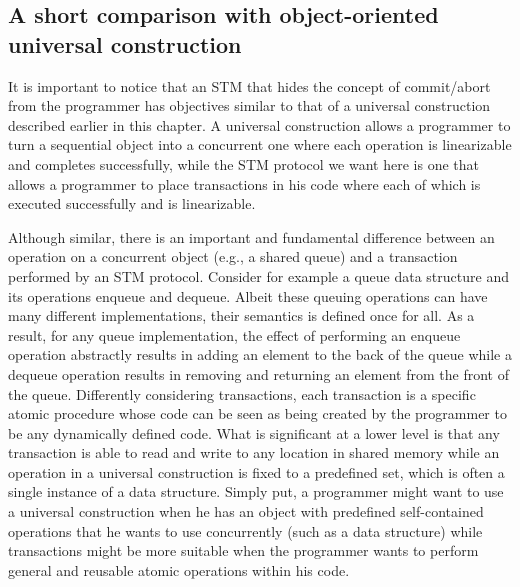 \subsection{A short comparison with object-oriented universal construction}
\label{sec:comparison-Herlihy}

It is important to notice that an STM that hides the concept of
commit/abort from the programmer has objectives similar to that of a
universal construction described earlier in this chapter.
A universal construction allows a programmer to turn a sequential
object into a concurrent one where each operation is linearizable
and completes successfully, while
the STM protocol we want here is one that allows a programmer to place transactions
in his code where each of which is executed successfully and is linearizable.


Although similar, there is an important and fundamental difference between an operation on 
a concurrent object (e.g.,  a shared queue) and a transaction performed
by an STM protocol. 
Consider for example a queue data structure and its operations enqueue
and dequeue.
Albeit these queuing operations can have many different implementations, 
their semantics is  defined once for all.
As a result, for any queue implementation, the effect of performing an enqueue operation
abstractly results in adding an element to the back of the queue
while a dequeue operation results in removing and returning an element from the
front of the queue.
Differently considering transactions, each transaction is a specific  atomic procedure whose 
code can be  seen as being created by the programmer to be any dynamically  defined code.
What is significant at a lower level is that any transaction is  able to read and
write to  any location in shared  memory while an operation  in a universal
construction is fixed to a predefined set, which is often a single instance
of a  data structure.
Simply put, a programmer might want to use a universal construction when
he has an object with predefined self-contained operations that
he wants to use concurrently (such as a data structure) while transactions
might be more suitable when the programmer wants to perform general and reusable
atomic operations within his code.


